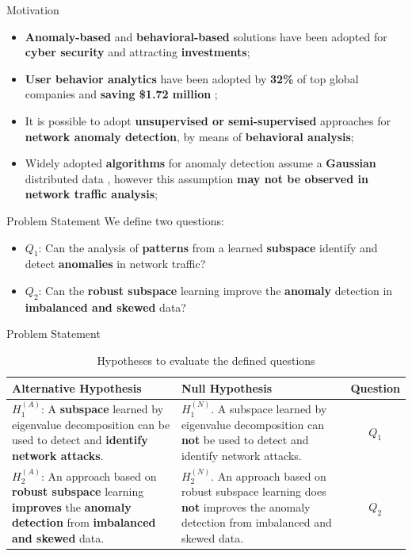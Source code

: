 \documentclass[newPxFont, numfooter, sectionpages]{beamer}
\begin{document}
\begin{frame}[c]{Motivation}
	\begin{itemize}
	    \item \textbf{Anomaly-based} and \textbf{behavioral-based} solutions have been adopted for \textbf{cyber security} and attracting \textbf{investments};
		\item \textbf{User behavior analytics} have been adopted by \textbf{32\%} of top global companies and \textbf{saving \$1.72 million} \cite{BISSELL2019};
		\item It is possible to adopt \textbf{unsupervised or semi-supervised} approaches for \textbf{network anomaly detection}, by means of \textbf{behavioral analysis};
		\item Widely adopted \textbf{algorithms} for anomaly detection assume a \textbf{Gaussian} distributed data \cite{lakhina2005mining}, however this assumption \textbf{may not be observed in network traffic analysis};
	\end{itemize}
\end{frame}

\begin{frame}[c]{Problem Statement}
    We define two questions:
    \begin{itemize}
    	\item $Q_1$: Can the analysis of \textbf{patterns} from a learned \textbf{subspace} identify and detect \textbf{anomalies} in network traffic?
    	\item $Q_2$: Can the \textbf{robust subspace} learning improve the \textbf{anomaly} detection in \textbf{imbalanced and skewed} data?
    \end{itemize}
\end{frame}

\begin{frame}[c]{Problem Statement}
    \begin{table}[htb]
    	\centering
    	\small
    	\caption{Hypotheses to evaluate the defined questions}
    	\label{tab:hypothesis}
        \begin{tabular}{|p{4cm}|p{4cm}|c|} \hline
            \textbf{Alternative Hypothesis}	&\textbf{Null Hypothesis}	&\textbf{Question} 	\\ \hline
            $H_1^{(A)}$: A \textbf{subspace} learned by eigenvalue decomposition can be used to detect and \textbf{identify network attacks}.
            &$H_1^{(N)}$. A subspace learned by eigenvalue decomposition can \textbf{not} be used to detect and identify network attacks.	&$Q_1$\\ \hline
            $H_2^{(A)}$: An approach based on \textbf{robust subspace} learning \textbf{improves} the \textbf{anomaly detection} from \textbf{imbalanced and skewed} data.	&$H_2^{(N)}$. An approach based on  robust subspace learning does \textbf{not} improves the anomaly detection from imbalanced and skewed data.	&$Q_2$\\ \hline
        \end{tabular}
    \end{table}
\end{frame}
\end{document}

